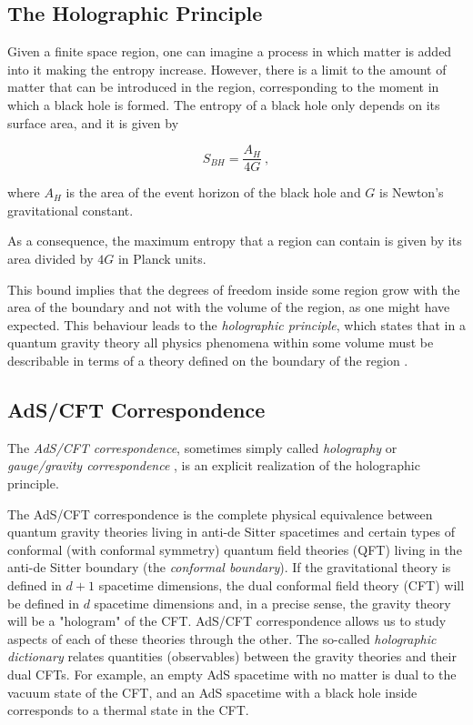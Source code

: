 \documentclass[twocolumn]{revtex4}
\providecommand{\eq}[2]{
    \begin{equation}
        #2
    \label{eq:#1}
    \end{equation}
}
\begin{document}
\subsection{The Holographic Principle} \label{ss:Holography}

Given a finite space region, one can imagine a process in which matter is added into it making the entropy increase. However, there is a limit to the amount of matter that can be introduced in the region, corresponding to the moment in which a black hole is formed. The entropy of a black hole only depends on its surface area, and it is given by \cite{bekenstein_black_1973}
\eq{BH}{
    S_{BH} = \frac{ A_H }{ 4 G } \ ,
}
where $A_H$ is the area of the event horizon of the black hole and $G$ is Newton's gravitational constant.

As a consequence, the maximum entropy that a region can contain is given by its area divided by $4G$ in Planck units.

This bound implies that the degrees of freedom inside some region grow with the area of the boundary and not with the volume of the region, as one might have expected. This behaviour leads to the \textit{holographic principle}, which states that in a quantum gravity theory all physics phenomena within some volume must be describable in terms of a theory defined on the boundary of the region \cite{t_hooft_dimensional_2009}.


\subsection{AdS/CFT Correspondence} \label{ss:AdS/CFT}

The \textit{AdS/CFT correspondence}, sometimes simply called \textit{holography} or \textit{gauge/gravity correspondence} \cite{maldacena_large_1999, witten_anti_1998}, is an explicit realization of the holographic principle.

The AdS/CFT correspondence is the complete physical equivalence between quantum gravity theories living in anti-de Sitter spacetimes and certain types of conformal (with conformal symmetry) quantum field theories (QFT) living in the anti-de Sitter boundary (the \textit{conformal boundary}). If the gravitational theory is defined in $d+1$ spacetime dimensions, the dual conformal field theory (CFT) will be defined in $d$ spacetime dimensions and, in a precise sense, the gravity theory will be a "hologram" of the CFT. AdS/CFT correspondence allows us to study aspects of each of these theories through the other. The so-called \textit{holographic dictionary} relates quantities (observables) between the gravity theories and their dual CFTs. For example, an empty AdS spacetime with no matter is dual to the vacuum state of the CFT, and an AdS spacetime with a black hole inside corresponds to a thermal state in the CFT.
\end{document}
